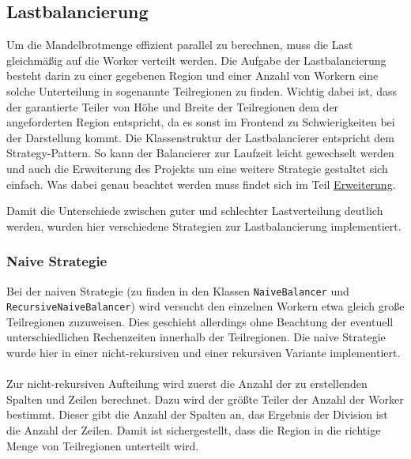 \subsection{Lastbalancierung}\label{sec:load_balancing}
Um die Mandelbrotmenge effizient parallel zu berechnen, muss die Last gleichmäßig auf die Worker verteilt werden.
Die Aufgabe der Lastbalancierung besteht darin zu einer gegebenen Region und einer Anzahl von Workern eine solche Unterteilung in sogenannte Teilregionen zu finden.
Wichtig dabei ist, dass der garantierte Teiler von Höhe und Breite der Teilregionen dem der angeforderten Region entspricht, da es sonst im Frontend zu Schwierigkeiten bei der Darstellung kommt.
Die Klassenstruktur der Lastbalancierer entspricht dem Strategy-Pattern. So kann der Balancierer zur Laufzeit leicht gewechselt werden und auch die Erweiterung des Projekts um eine weitere Strategie gestaltet sich einfach.
Was dabei genau beachtet werden muss findet sich im Teil \hyperref[lastbalancierung_erweiterung]{Erweiterung}.


Damit die Unterschiede zwischen guter und schlechter Lastverteilung deutlich werden, wurden hier verschiedene Strategien zur Lastbalancierung implementiert.

\subsubsection{Naive Strategie}

Bei der naiven Strategie (zu finden in den Klassen \verb|NaiveBalancer| und \\ \verb|RecursiveNaiveBalancer|) wird versucht den einzelnen Workern etwa gleich große Teilregionen zuzuweisen.
Dies geschieht allerdings ohne Beachtung der eventuell unterschiedlichen Rechenzeiten innerhalb der Teilregionen.
Die naive Strategie wurde hier in einer nicht-rekursiven  und einer rekursiven Variante implementiert.

\paragraph*{}\label{lastbalancierung_naiv}
Zur nicht-rekursiven Aufteilung wird zuerst die Anzahl der zu erstellenden Spalten und Zeilen berechnet.
Dazu wird der größte Teiler der Anzahl der Worker bestimmt. Dieser gibt die Anzahl der Spalten an, das Ergebnis der Division ist die Anzahl der Zeilen.
Damit ist sichergestellt, dass die Region in die richtige Menge von Teilregionen unterteilt wird.

